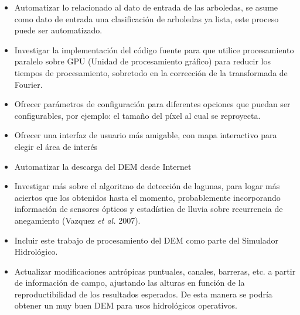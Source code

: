 \documentclass[10pt,a4paper, twoside]{report}
\begin{document}
\begin{itemize}
	\item Automatizar lo relacionado al dato de entrada de las arboledas, se asume como dato de entrada una clasificación de arboledas ya lista, este proceso puede ser automatizado.
	\item Investigar la implementación del código fuente para que utilice procesamiento paralelo sobre GPU (Unidad de procesamiento gráfico) para reducir los tiempos de procesamiento, sobretodo en la corrección de la transformada de Fourier.
	\item Ofrecer parámetros de configuración para diferentes opciones que puedan ser configurables, por ejemplo: el tamaño del píxel al cual se reproyecta.
	\item Ofrecer una interfaz de usuario más amigable, con mapa interactivo para elegir el área de interés
	\item Automatizar la descarga del DEM desde Internet
	\item Investigar más sobre el algoritmo de detección de lagunas, para logar más aciertos que los obtenidos hasta el momento, probablemente incorporando información de sensores ópticos y estadística de lluvia sobre recurrencia de anegamiento (Vazquez \textit{et al.} 2007).
	\item Incluir este trabajo de procesamiento del DEM como parte del Simulador Hidrológico.
	\item Actualizar modificaciones antrópicas puntuales, canales, barreras, etc. a partir de información de campo, ajustando las alturas en función de la reproductibilidad de los resultados esperados. De esta manera se podría obtener un muy buen DEM para usos hidrológicos operativos.
\end{itemize}



 
\end{document}

